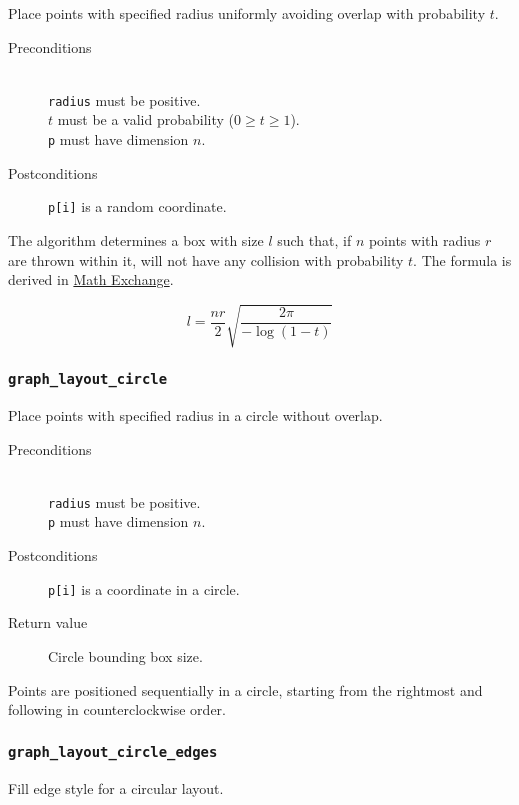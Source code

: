Place points with specified radius uniformly avoiding overlap 
with probability $t$.

\begin{description}
 \item[Preconditions]~\\
   \texttt{radius} must be positive.\\
   $t$ must be a valid probability ($0 \ge t \ge 1$).\\
   \texttt{p} must have dimension $n$.
 \item[Postconditions] \texttt{p[i]} is a random coordinate.
\end{description}

The algorithm determines a box with size $l$ such that, if $n$ 
points with radius $r$ are thrown within it, will not have any 
collision with probability $t$. The formula is derived in 
\href{http://math.stackexchange.com/q/325844/37667}{Math Exchange}.

\begin{equation*}
 l = \frac{nr}{2} \sqrt{\frac{2 \pi}{-\log(1-t)}}
\end{equation*}

\subsubsection{\texttt{graph\_layout\_circle}}

Place points with specified radius in a circle without overlap.

\begin{description}
 \item[Preconditions]~\\
   \texttt{radius} must be positive.\\
   \texttt{p} must have dimension $n$.
 \item[Postconditions] \texttt{p[i]} is a coordinate in a circle.
 \item[Return value] Circle bounding box size.
\end{description}

Points are positioned sequentially in a circle, starting from the rightmost
and following in counterclockwise order.

\subsubsection{\texttt{graph\_layout\_circle\_edges}}

Fill edge style for a circular layout.

